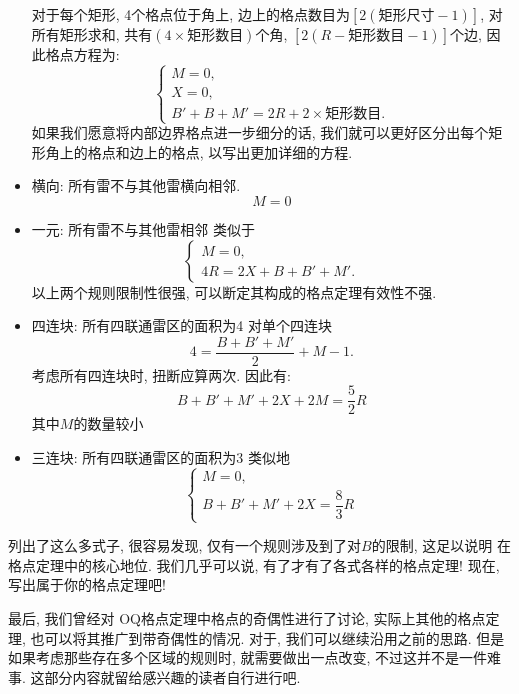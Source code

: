 \documentclass{ctexart}
\newcommand{\varible}[1]{{\Noto[#1]}}
\begin{document}
\begin{itemize}
    对于每个矩形, 4个格点位于角上, 边上的格点数目为$[2(\text{矩形尺寸}-1)]$, 对所有矩形求和, 共有$(4\times\text{矩形数目})$个角, $[2(R-\text{矩形数目}-1)]$个边, 因此格点方程为:
            $$
            \begin{cases}
                M = 0,\\
                X = 0,\\
                B' + B + M' = 2R + 2\times\text{矩形数目}.
            \end{cases}
            $$
    如果我们愿意将内部边界格点进一步细分的话, 我们就可以更好区分出每个矩形角上的格点和边上的格点, 以写出更加详细的方程.
    \item \varible{H} {\heiti 横向: 所有雷不与其他雷横向相邻.}
        $$
        M = 0
        $$
    \item \varible{U} {\heiti 一元: 所有雷不与其他雷相邻}
    类似于\varible{D}
        $$
        \begin{cases}
            M = 0,\\
            4R = 2X + B + B' + M'.
        \end{cases}
        $$
        以上两个规则限制性很强, 可以断定其构成的格点定理有效性不强.
    \item \varible{2G} {\heiti 四连块: 所有四联通雷区的面积为4}
        对单个四连块
        $$
        4 = \frac{B + B' + M'}{2} + M - 1.
        $$
        考虑所有四连块时, 扭断应算两次. 因此有:
        $$
        B + B' + M' + 2X + 2M = \frac{5}{2}R 
        $$
        其中$M$的数量较小
    \item \varible{2G'} {\heiti 三连块: 所有四联通雷区的面积为3}
    类似地
    $$
    \begin{cases}
        M = 0,\\
        B + B' + M' + 2X = \dfrac{8}{3}R
    \end{cases}
    $$
\end{itemize}

列出了这么多式子, 很容易发现, 仅有\varible{Q}一个规则涉及到了对$B$的限制, 这足以说明\varible{Q} 在格点定理中的核心地位. 我们几乎可以说, 有了\varible{Q}才有了各式各样的格点定理! 现在, 写出属于你的格点定理吧!

最后, 我们曾经对 OQ格点定理中格点的奇偶性进行了讨论, 实际上其他的格点定理, 也可以将其推广到带奇偶性的情况.
对于\varible{S}, 我们可以继续沿用之前的思路. 但是如果考虑那些存在多个区域的规则时, 就需要做出一点改变, 不过这并不是一件难事. 这部分内容就留给感兴趣的读者自行进行吧.
\end{document}
